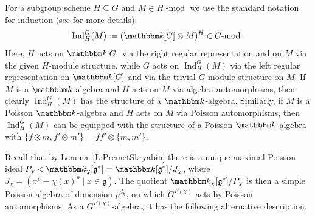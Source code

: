 \documentclass[twoside,12pt,reqno]{amsart}
\theoremstyle{remark}
\numberwithin{equation}{section}
\def\k{{\mathbbm k}}
\def\lmod{\!\operatorname{-mod}}
\def\Ind{\operatorname{Ind}}
\def\g{{\mathfrak g}}
\begin{document}
For a subgroup scheme $H \subseteq G$ and $M \in H\lmod$ we use the standard notation for induction (see \cite[\textsection I.3.2]{JanRAGS} for more details):
\begin{eqnarray}
    \Ind_H^G(M) := (\k[G] \otimes M)^H \in G\lmod.
\end{eqnarray}
Here, $H$ acts on $\k[G]$ via the right regular representation and on $M$ via the given $H$-module structure, while $G$ acts on $\Ind_H^G(M)$ via the left regular representation on $\k[G]$ and via the trivial $G$-module structure on $M$. If $M$ is a $\k$-algebra and $H$ acts on $M$ via algebra automorphisms, then clearly $\Ind_H^G(M)$ has the structure of a $\k$-algebra. Similarly, if $M$ is a Poisson $\k$-algebra and $H$ acts on $M$ via Poisson automorphisms, then $\Ind_H^G(M)$ can be equipped with the structure of a Poisson $\k$-algebra with $\{f\otimes m,f'\otimes m'\}=ff'\otimes\{m,m'\}$.


Recall that by Lemma~\ref{L:PremetSkryabin} there is a unique maximal Poisson ideal $P_\chi \lhd \k_\chi[\g^*] = \k[\g^*] / J_\chi$, where $J_\chi = (x^p - \chi(x)^p \mid x\in \g)$. The quotient $\k_\chi[\g^*] / P_\chi$ is then a simple Poisson algebra of dimension $p^{d_\chi}$, on which $G^{F(\chi)}$ acts by Poisson automorphisms. As a $G^{F(\chi)}$-algebra, it has the following alternative description. 
\end{document}
